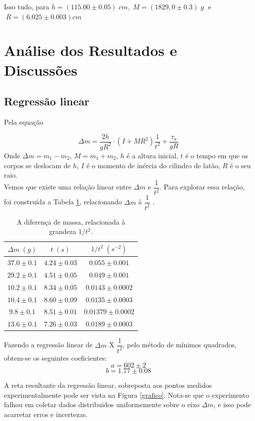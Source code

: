 \documentclass[12pt,a4paper]{article}
\begin{document}
Isso tudo, para $h = (115.00 \pm 0.05) \; cm, \; M = (1829,0 \pm 0.3) \; g \;$ e $\; R = (6.025 \pm 0.003) cm$

\section{Análise dos Resultados e Discussões}
\subsection{Regressão linear}
Pela equação 

$$\Delta m = \frac{2h}{gR^2} \cdot (I + MR^2)\dfrac{1}{t^2}  + \frac{\tau _a} {gR}$$
Onde $\Delta m = m_1 - m_2$, $ M = m_1 + m_2 $, $h$ é a altura inicial, $t$ é o tempo em que os corpos se deslocam de $h$, $I$ é o momento de inércia do cilindro de latão, $R$ é o seu raio.\\
Vemos que existe uma relação linear entre $\Delta m$ e $ \dfrac{1}{t^2}$. Para explorar essa relação, foi construída a Tabela \ref{linear}, relacionando $\Delta m$ à $ \dfrac{1}{t^2} $ .

\begin{table}[!htbp]
\centering
\def\arraystretch{1.5}
\caption{A diferença de massa, relacionada à grandeza $1/t^2$.}
\begin{tabular}{|c|c|c|}
\hline 
$\Delta m \; (g)$ & $t \; (s)$ & $1/t^2 \; (s^{-2})$ \\ 
\hline 
$37.0 \pm 0.1$ & $4.24 \pm 0.03 $ & $0.055 \pm 0.001 $  \\
\hline
$29.2 \pm 0.1$ & $4.51 \pm 0.05 $ & $0.049 \pm 0.001$ \\
\hline
$10.2 \pm 0.1$ & $8.34 \pm 0.05 $ & $0.0143 \pm 0.0002$\\
\hline
$10.4 \pm 0.1$ & $8.60 \pm 0.09 $ & $ 0.0135 \pm 0.0003 $\\
\hline
$9.8 \pm 0.1$ & $8.51 \pm 0.01 $ & $ 0.01379 \pm 0.0002 $\\
\hline
$13.6 \pm 0.1$ & $7.26 \pm 0.03 $ & $ 0.0189 \pm 0.0003 $ \\
\hline
\end{tabular} 
\label{linear}
\end{table}
Fazendo a regressão linear de $ \Delta m$ X $ \dfrac{1}{t^2} $, pelo método de mínimos quadrados, obtem-se os seguintes coeficientes: 
	$$ a = 602 \pm 2 $$
	$$ b = 1.77 \pm 0.08 $$

A reta resultante da regressão linear, sobreposta aos pontos medidos experimentalmente pode ser vista na Figura \ref{grafico}. Nota-se que o experimento falhou em coletar dados distribuidos uniformemente sobre o eixo $ \Delta m$, e isso pode acarretar erros e incertezas.
\end{document}
